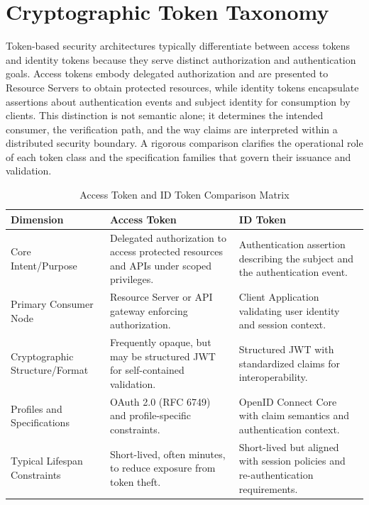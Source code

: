 \documentclass[11pt,a4paper]{report}
\begin{document}
\section{Cryptographic Token Taxonomy}
\label{sec:token-taxonomy}
Token-based security architectures typically differentiate between access tokens and identity tokens because they serve distinct authorization and authentication goals. Access tokens embody delegated authorization and are presented to Resource Servers to obtain protected resources, while identity tokens encapsulate assertions about authentication events and subject identity for consumption by clients. This distinction is not semantic alone; it determines the intended consumer, the verification path, and the way claims are interpreted within a distributed security boundary. A rigorous comparison clarifies the operational role of each token class and the specification families that govern their issuance and validation.

\begin{table}[htbp]
    \centering
    \small
    \setlength{\tabcolsep}{4pt}
    \renewcommand{\arraystretch}{1.2}
    \caption{Access Token and ID Token Comparison Matrix}
    \label{tab:token-comparison}
    \begin{tabular}{@{}>{\raggedright\arraybackslash}p{} >{\raggedright\arraybackslash}p{} >{\raggedright\arraybackslash}p{}@{}}
        \toprule
        \textbf{Dimension} & \textbf{Access Token} & \textbf{ID Token} \\
        \midrule
        Core Intent/Purpose & Delegated authorization to access protected resources and APIs under scoped privileges. & Authentication assertion describing the subject and the authentication event. \\
        Primary Consumer Node & Resource Server or API gateway enforcing authorization. & Client Application validating user identity and session context. \\
        Cryptographic Structure/Format & Frequently opaque, but may be structured JWT for self-contained validation. & Structured JWT with standardized claims for interoperability. \\
        Profiles and Specifications & OAuth 2.0 (RFC 6749) and profile-specific constraints. & OpenID Connect Core with claim semantics and authentication context. \\
        Typical Lifespan Constraints & Short-lived, often minutes, to reduce exposure from token theft. & Short-lived but aligned with session policies and re-authentication requirements. \\
        \bottomrule
    \end{tabular}
\end{table}
\end{document}
